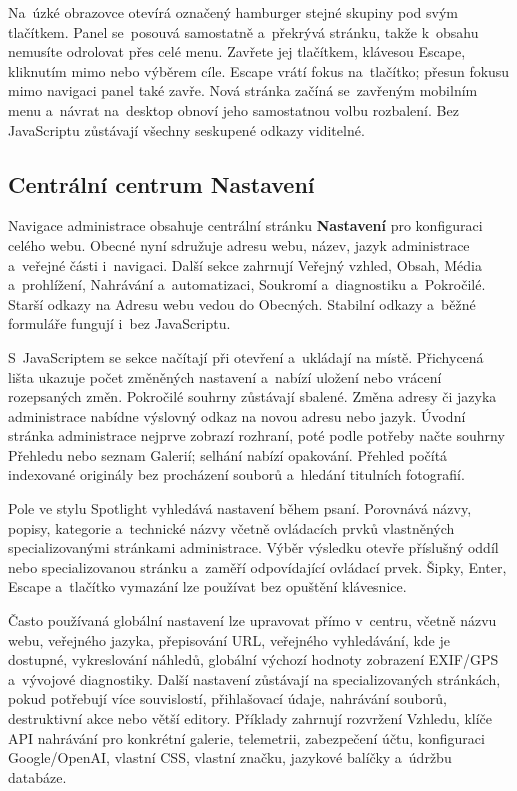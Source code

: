 \documentclass[11pt,a4paper]{article}
\begin{document}
Na~úzké obrazovce otevírá označený hamburger stejné skupiny pod svým tlačítkem.
Panel se~posouvá samostatně a~překrývá stránku, takže k~obsahu nemusíte
odrolovat přes celé menu. Zavřete jej tlačítkem, klávesou Escape, kliknutím mimo
nebo výběrem cíle. Escape vrátí fokus na~tlačítko; přesun fokusu mimo navigaci
panel také zavře. Nová stránka začíná se~zavřeným mobilním menu a~návrat
na~desktop obnoví jeho samostatnou volbu rozbalení. Bez JavaScriptu zůstávají
všechny seskupené odkazy viditelné.

\subsection{Centrální centrum Nastavení}

Navigace administrace obsahuje centrální stránku \textbf{Nastavení} pro
konfiguraci celého webu. Obecné nyní sdružuje adresu webu, název, jazyk
administrace a~veřejné části i~navigaci. Další sekce zahrnují Veřejný vzhled,
Obsah, Média a~prohlížení, Nahrávání a~automatizaci, Soukromí a~diagnostiku
a~Pokročilé. Starší odkazy na Adresu webu vedou do Obecných. Stabilní odkazy
a~běžné formuláře fungují i~bez JavaScriptu.

S~JavaScriptem se sekce načítají při otevření a~ukládají na místě. Přichycená
lišta ukazuje počet změněných nastavení a~nabízí uložení nebo vrácení
rozepsaných změn. Pokročilé souhrny zůstávají sbalené. Změna adresy či jazyka
administrace nabídne výslovný odkaz na novou adresu nebo jazyk. Úvodní stránka
administrace nejprve zobrazí rozhraní, poté podle potřeby načte souhrny Přehledu
nebo seznam Galerií; selhání nabízí opakování. Přehled počítá indexované
originály bez procházení souborů a~hledání titulních fotografií.

Pole ve stylu Spotlight vyhledává nastavení během psaní. Porovnává názvy,
popisy, kategorie a~technické názvy včetně ovládacích prvků vlastněných
specializovanými stránkami administrace. Výběr výsledku otevře příslušný oddíl
nebo specializovanou stránku a~zaměří odpovídající ovládací prvek. Šipky, Enter,
Escape a~tlačítko vymazání lze používat bez opuštění klávesnice.

Často používaná globální nastavení lze upravovat přímo v~centru, včetně názvu
webu, veřejného jazyka, přepisování URL, veřejného vyhledávání, kde je dostupné,
vykreslování náhledů, globální výchozí hodnoty zobrazení EXIF/GPS a~vývojové
diagnostiky. Další nastavení zůstávají na specializovaných stránkách, pokud
potřebují více souvislostí, přihlašovací údaje, nahrávání souborů, destruktivní
akce nebo větší editory. Příklady zahrnují rozvržení Vzhledu, klíče API
nahrávání pro konkrétní galerie, telemetrii, zabezpečení účtu, konfiguraci
Google/OpenAI, vlastní CSS, vlastní značku, jazykové balíčky a~údržbu databáze.
\end{document}
